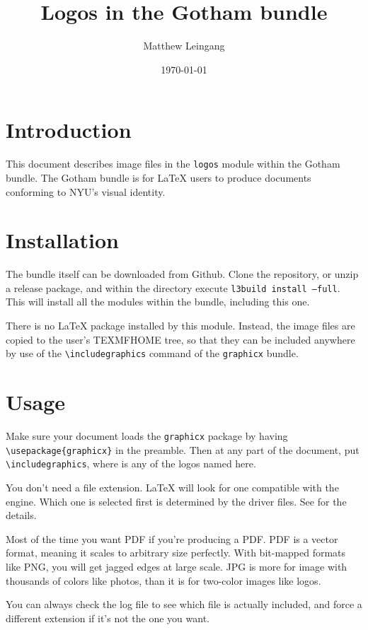 \documentclass{ltxdoc}
\title{Logos in the Gotham bundle}
\author{Matthew Leingang}
\date{\today}
\begin{document}
\maketitle

\section{Introduction}

This document describes image files in the \texttt{logos} module within the 
Gotham bundle.  The Gotham bundle is for \LaTeX{} users to produce documents 
conforming to NYU's visual identity.  

\section{Installation}

The bundle itself can be downloaded from Github.  Clone the repository,
or unzip a release package, and within the directory execute \texttt{l3build install --full}.
This will install all the modules within the bundle, including this one.

There is no \LaTeX{} package installed by this module.  Instead, the image files 
are copied to the user's TEXMFHOME tree, so that they can be included anywhere 
by use of the \verb|\includegraphics| command of the \texttt{graphicx} bundle.

\section{Usage}

Make sure your document loads the \texttt{graphicx} package by having
\verb|\usepackage{graphicx}| in the preamble.  Then at any part of the document,
put \verb|\includegraphics|, where  is any of the logos
named here.

You don't need a file extension.  \LaTeX{} will look for one compatible with the
engine.  Which one is selected first is determined by the driver files.  See
\cite{tse-graphics-order} for the details.

Most of the time you want PDF if you're producing a PDF.  PDF is a vector format,
meaning it scales to arbitrary size perfectly.  With bit-mapped formats like PNG,
you will get jagged edges at large scale.  JPG is more for image with thousands
of colors like photos, than it is for two-color images like logos.

You can always check the log file to see which file is actually included, and force
a different extension if it's not the one you want.
\end{document}
